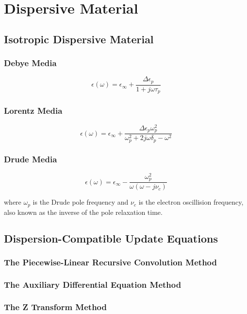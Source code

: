 \section{Dispersive Material}

\subsection{Isotropic Dispersive Material}
\subsubsection{Debye Media}

\begin{displaymath}
  \epsilon(\omega) = \epsilon_{\infty} + \frac{\Delta\epsilon_p}{1+j\omega\tau_p}
\end{displaymath}

\subsubsection{Lorentz Media}


\begin{displaymath}
  \epsilon(\omega) = \epsilon_{\infty} + \frac{\Delta\epsilon_p\omega_p^2}{\omega_p^2 + 2j\omega\delta_p - \omega^2}
\end{displaymath}


\subsubsection{Drude Media}

\begin{displaymath}
  \epsilon(\omega) = \epsilon_{\infty} - \frac{\omega_p^2}{\omega(\omega-j\nu_c)}
\end{displaymath}

where $\omega_p$ is the Drude pole frequency and $\nu_c$ is the electron oscillision frequency, also known as the
inverse of the pole relaxation time.

\subsection{Dispersion-Compatible Update Equations}

\subsubsection{The Piecewise-Linear Recursive Convolution Method}

\subsubsection{The Auxiliary Differential Equation Method}

\subsubsection{The Z Transform Method}
